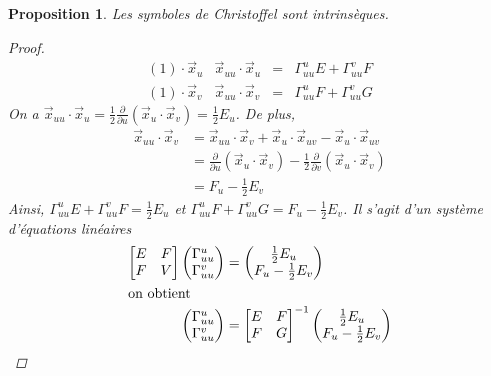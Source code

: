 \documentclass{report}
\newtheorem*{prop}{Proposition}
\theoremstyle{definition}
\theoremstyle{remark}
\begin{document}
	\begin{prop}
		Les symboles de Christoffel sont intrins\`eques.
		\begin{proof}
			\[ \begin{array}{rrcl}
				(1)\cdot\vec x_u&\vec x_{uu}\cdot\vec x_u&=&\Gamma_{uu}^uE+\Gamma_{uu}^vF\\
				(1)\cdot\vec x_v&\vec x_{uu}\cdot\vec x_v&=&\Gamma_{uu}^uF+\Gamma_{uu}^vG
			\end{array} \]
			On a $\vec x_{uu}\cdot\vec x_u = \frac{1}{2}\frac{\partial}{\partial u}(\vec x_u\cdot\vec x_v) = \frac{1}{2}E_u$. De plus,
			\begin{align*}
				\vec x_{uu}\cdot\vec x_v&= \vec x_{uu}\cdot\vec x_v + \vec x_u\cdot\vec x_{uv} - \vec x_u\cdot\vec x_{uv}\\
				&= \frac{\partial}{\partial u}(\vec x_u\cdot\vec x_v) - \frac{1}{2}\frac{\partial}{\partial v}(\vec x_u\cdot\vec x_v)\\
				&= F_u-\frac{1}{2}E_v
			\end{align*}
			Ainsi, $\Gamma_{uu}^uE+\Gamma_{uu}^vF=\frac{1}{2}E_u$ et $\Gamma_{uu}^uF+\Gamma_{uu}^vG=F_u-\frac{1}{2}E_v$. Il s'agit d'un syst\`eme d'\'equations lin\'eaires
			\begin{align*}
				\begin{bmatrix}
					E&F\\F&V
				\end{bmatrix} \begin{pmatrix}
					\Gamma_{uu}^u\\\Gamma_{uu}^v
				\end{pmatrix}&= \begin{pmatrix}
					\frac{1}{2}E_u\\F_u-\frac{1}{2}E_v
				\end{pmatrix}\\
				\shortintertext{on obtient}
				\begin{pmatrix}
					\Gamma_{uu}^u\\\Gamma_{uu}^v
				\end{pmatrix}&= \begin{bmatrix}
					E&F\\F&G
				\end{bmatrix}^{-1} \begin{pmatrix}
					\frac{1}{2}E_u\\F_u-\frac{1}{2}E_v
				\end{pmatrix}
			\end{align*}


\end{proof}
\end{prop}
\end{document}
